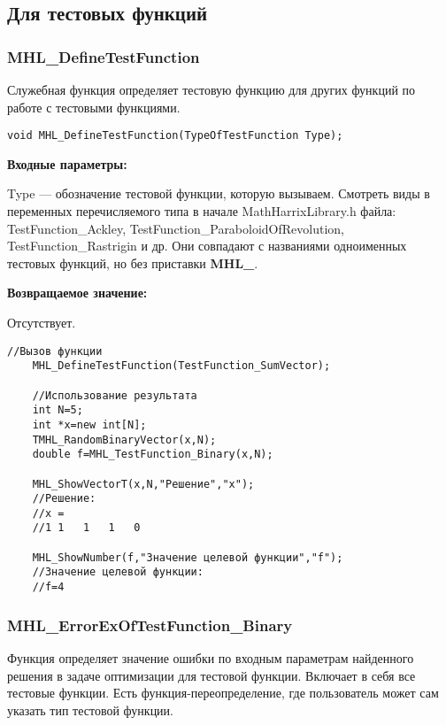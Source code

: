 \documentclass[a4paper,12pt]{article}
\begin{document}
\subsection{Для тестовых функций}

\subsubsection{MHL\_DefineTestFunction}\label{MHL_DefineTestFunction}

Служебная функция определяет тестовую функцию для других функций по работе с тестовыми функциями.


\begin{lstlisting}[label=code_syntax_MHL_DefineTestFunction,caption=Синтаксис]
void MHL_DefineTestFunction(TypeOfTestFunction Type);
\end{lstlisting}

\textbf{Входные параметры:}
  
Type --- обозначение тестовой функции, которую вызываем.
Смотреть виды в переменных перечисляемого типа в начале MathHarrixLibrary.h файла: TestFunction\_Ackley, TestFunction\_ParaboloidOfRevolution, TestFunction\_Rastrigin и др. Они совпадают с названиями одноименных тестовых функций, но без приставки \textbf{MHL\_}.

\textbf{Возвращаемое значение:}
 
Отсутствует.


\begin{lstlisting}[label=code_use_MHL_DefineTestFunction,caption=Пример использования]
    //Вызов функции
    MHL_DefineTestFunction(TestFunction_SumVector);

    //Использование результата
    int N=5;
    int *x=new int[N];
    TMHL_RandomBinaryVector(x,N);
    double f=MHL_TestFunction_Binary(x,N);

    MHL_ShowVectorT(x,N,"Решение","x");
    //Решение:
    //x =	
    //1	1	1	1	0

    MHL_ShowNumber(f,"Значение целевой функции","f");
    //Значение целевой функции:
    //f=4
\end{lstlisting}

\subsubsection{MHL\_ErrorExOfTestFunction\_Binary}\label{MHL_ErrorExOfTestFunction_Binary}

Функция определяет значение ошибки по входным параметрам найденного решения в задаче оптимизации для тестовой функции. Включает в себя все тестовые функции. Есть функция-переопределение, где пользователь может сам указать тип тестовой функции.
\end{document}

